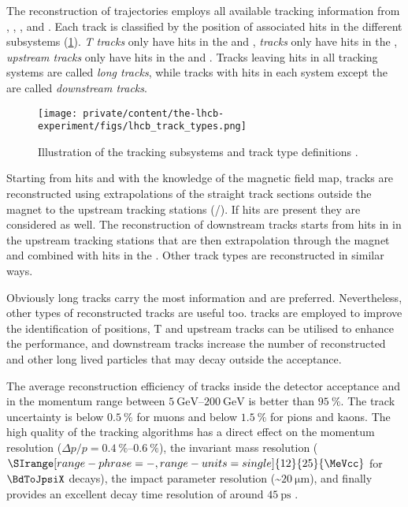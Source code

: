 The reconstruction of trajectories employs all available tracking information
from \VELO, \TT, \IT, and \OT \cite{Aaij:2014pwa}. Each track is classified by
the position of associated hits in the different subsystems
(\cref{fig:lhcb_experiment:tracking:techniques_and_performance:tracktypes}).
\emph{T tracks} only have hits in the \IT and \OT, \emph{\VELO tracks} only have
hits in the
\VELO, \emph{upstream tracks} only have hits in the \VELO and \TT. Tracks
leaving hits in all tracking systems are called \emph{long tracks}, while tracks
with hits in each system except the \VELO are called \emph{downstream tracks}.
%
\begin{figure}[t]
  \texttt{[image: private/content/the-lhcb-experiment/figs/lhcb\_track\_types.png]}
  \caption{
    Illustration of the \LHCb tracking subsystems and track type definitions \cite{Aaij:2014pwa}.
  }
  \label{fig:lhcb_experiment:tracking:techniques_and_performance:tracktypes}
\end{figure}
%
Starting from \VELO hits and with the knowledge of the magnetic field map,
tracks are reconstructed using extrapolations of the straight track sections
outside the magnet to the upstream tracking stations (\IT/\OT). If \TT hits are
present they are considered as well. The reconstruction of downstream tracks
starts from hits in in the upstream tracking stations that are then
extrapolation through the magnet and combined with hits in the \TT. Other track
types are reconstructed in similar ways. 

Obviously long tracks carry the most information and are preferred.
Nevertheless, other types of reconstructed tracks are useful too. \VELO tracks
are employed to improve the identification of \PV positions, T and upstream
tracks can be utilised to enhance the \RICH performance, and downstream tracks
increase the number of reconstructed \KS and other long lived particles that may
decay outside the \VELO acceptance.

The average reconstruction efficiency of tracks inside the detector acceptance
and in the momentum range between 
$\SIrange[range-phrase = -,range-units = single]{5}{200}{\GeV}$ is better than
$\SI{95}{\percent}$. The track uncertainty is below $\SI{0.5}{\percent}$ for
muons and below $\SI{1.5}{\percent}$ for pions and kaons. The high quality of
the tracking algorithms has a direct effect on the momentum resolution ($\Delta
p/p = \SIrange[range-phrase = -,range-units = single]{0.4}{0.6}{\percent}$), the
invariant mass resolution ($\SIrange[range-phrase = -,range-units =single]{12}{25}{\MeVcc}$ 
for $\BdToJpsiX$ decays), the impact parameter resolution (\sim$\SI{20}{\micro\metre}$), 
and finally provides an excellent decay time resolution of around
$\SI{45}{\ps}$ \cite{lhcb:performance}.

